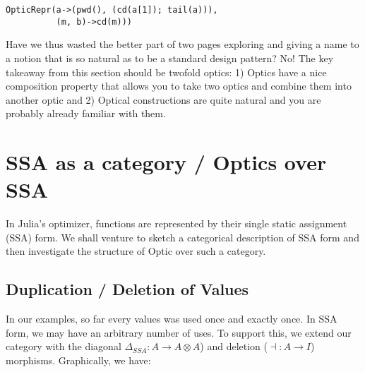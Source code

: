 \documentclass[letterpaper, 10 pt, conference]{ieeeconf}  %
\begin{document}
\begin{verbatim}
OpticRepr(a->(pwd(), (cd(a[1]); tail(a))),
          (m, b)->cd(m)))
\end{verbatim}

Have we thus wasted the better part of two pages exploring and giving a name to
a notion that is so natural as to be a standard design pattern? No! The key
takeaway from this section should be twofold optics: 1) Optics have a
nice composition property that allows you to take two optics and combine
them into another optic and 2) Optical constructions are quite natural and
you are probably already familiar with them.

\section{SSA as a category / Optics over SSA}
\label{ssair}

In Julia's optimizer, functions are represented by their single static
assignment (SSA) form. We shall venture to sketch a categorical description
of SSA form and then investigate the structure of Optic over such a category.

\subsection{Duplication / Deletion of Values}

In our examples, so far every values was used once and exactly once. In SSA
form, we may have an arbitrary number of uses. To support this, we extend our
category with the diagonal $\Delta_{SSA}: A \to A \otimes A$) and deletion ($\dashv: A \to I$) morphisms.
Graphically, we have:

\begin{center}
    \hspace{2em}
\end{center}
\end{document}
